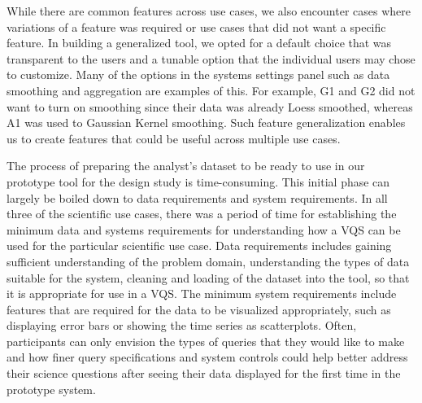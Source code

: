 {
\npar While there are common features across use cases, we also encounter cases where variations of a feature was required or use cases that did not want a specific feature. In building a generalized tool, we opted for a default choice that was transparent to the users and a tunable option that the individual users may chose to customize. Many of the options in the systems settings panel such as data smoothing and aggregation are examples of this. For example, G1 and G2 did not want to turn on smoothing since their data was already Loess smoothed, whereas A1 was used to Gaussian Kernel smoothing. Such feature generalization enables us to create features that could be useful across multiple use cases.

\npar The process of preparing the analyst's dataset to be ready to use in our prototype tool for the design study is time-consuming. This initial phase can largely be boiled down to data requirements and system requirements. In all three of the scientific use cases, there was a period of time for establishing the minimum data and systems requirements for understanding how a VQS can be used for the particular scientific use case. Data requirements includes gaining sufficient understanding of the problem domain, understanding the types of data suitable for the system, cleaning and loading of the dataset into the tool, so that it is appropriate for use in a VQS. The minimum system requirements include features that are required for the data to be visualized appropriately, such as displaying error bars or showing the time series as scatterplots. Often, participants can only envision the types of queries that they would like to make and how finer query specifications and system controls could help better address their science questions after seeing their data displayed for the first time in the prototype system.

}
